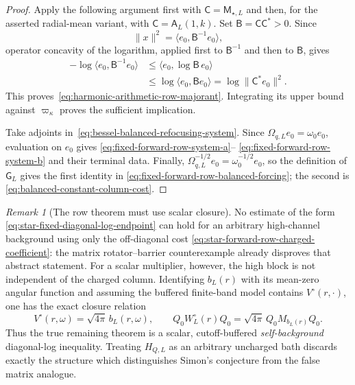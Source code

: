 \documentclass[11pt]{article}
\theoremstyle{definition}
\theoremstyle{remark}
\newtheorem{remark}[theorem]{Remark}
\begin{document}
\begin{proof}
Apply the following argument first with
$\mathsf C=\mathsf M_{\star,L}$ and then, for the asserted radial-mean
variant, with $\mathsf C=\mathsf A_L(1,k)$.  Set
$\mathsf B=\mathsf C\mathsf C^*>0$.  Since
\begin{equation}
 \|x\|^2
 =\langle e_0,\mathsf B^{-1}e_0\rangle,
\end{equation}
operator concavity of the logarithm, applied first to $\mathsf B^{-1}$ and
then to $\mathsf B$, gives
\begin{align}
 -\log\langle e_0,\mathsf B^{-1}e_0\rangle
 &\leq\langle e_0,\log\mathsf B\,e_0\rangle\\
 &\leq\log\langle e_0,\mathsf B e_0\rangle
 =\log\|\mathsf C^*e_0\|^2.
\end{align}
This proves~\eqref{eq:harmonic-arithmetic-row-majorant}.  Integrating its
upper bound against $\varpi_\kappa$ proves the sufficient implication.

Take adjoints in~\eqref{eq:bessel-balanced-refocusing-system}.  Since
$\Omega_{q,L}e_0=\omega_0e_0$, evaluation on $e_0$ gives
\eqref{eq:fixed-forward-row-system-a}--
\eqref{eq:fixed-forward-row-system-b} and their terminal data.  Finally,
$\Omega_{q,L}^{-1/2}e_0=\omega_0^{-1/2}e_0$, so the definition of
$\mathsf G_L$ gives the first identity in
\eqref{eq:fixed-forward-row-balanced-forcing}; the second is
\eqref{eq:balanced-constant-column-cost}.
\end{proof}

\begin{remark}[The row theorem must use scalar closure]
\label{rem:star-row-scalar-closure}
No estimate of the form
\eqref{eq:star-fixed-diagonal-log-endpoint} can hold for an arbitrary
high-channel background using only the off-diagonal cost
\eqref{eq:star-forward-row-charged-coefficient}: the matrix
rotator--barrier counterexample already disproves that abstract statement.
For a scalar multiplier, however, the high block is not independent of the
charged column.  Identifying $b_L(r)$ with its mean-zero angular function and
assuming the buffered finite-band model contains $V^\circ(r,\cdot)$, one has
the exact closure relation
\begin{equation}
 V^\circ(r,\omega)=\sqrt{4\pi}\,b_L(r,\omega),
 \qquad
 Q_0W_L^\circ(r)Q_0
 =\sqrt{4\pi}\,Q_0M_{b_L(r)}Q_0.
 \label{eq:scalar-star-closure}
\end{equation}
Thus the true remaining theorem is a scalar, cutoff-buffered
\emph{self-background} diagonal-log inequality.  Treating $H_{Q,L}$ as an
arbitrary uncharged bath discards exactly the structure which distinguishes
Simon's conjecture from the false matrix analogue.
\end{remark}
\end{document}
